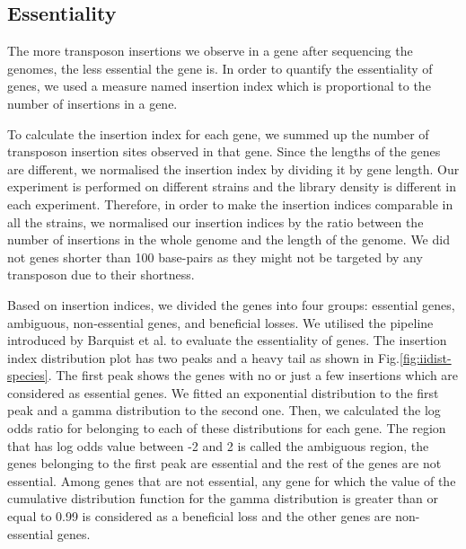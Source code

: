 \documentclass[12pt,letterpaper]{article}
\begin{document}
\subsection{Essentiality}\label{sec:essentiality}
The more transposon insertions we observe in a gene after sequencing the genomes, the less essential the gene is. In order to quantify the essentiality of genes, we used a measure named insertion index which is proportional to the number of insertions in a gene.

To calculate the insertion index for each gene, we summed up the number of transposon insertion sites observed in that gene. Since the lengths of the genes are different, we normalised the insertion index by dividing it by gene length. Our experiment is performed on different strains and the library density is different in each experiment. Therefore, in order to make the insertion indices comparable in all the strains, we normalised our insertion indices by the ratio between the number of insertions in the whole genome and the length of the genome. We did not genes shorter than 100 base-pairs as they might not be targeted by any transposon due to their shortness. 

Based on insertion indices, we divided the genes into four groups: essential genes, ambiguous, non-essential genes, and beneficial losses. We utilised the pipeline introduced by Barquist et al.\@ \cite{barquist_tradis_2016} to evaluate the essentiality of genes. The insertion index distribution plot has two peaks and a heavy tail as shown in Fig.\@ \ref{fig:iidist-species}. The first peak shows the genes with no or just a few insertions which are considered as essential genes. We fitted an exponential distribution to the first peak and a gamma distribution to the second one. Then, we calculated the log odds ratio for belonging to each of these distributions for each gene. The region that has log odds value between -2 and 2 is called the ambiguous region, the genes belonging to the first peak are essential and the rest of the genes are not essential. Among genes that are not essential, any gene for which the value of the cumulative distribution function for the gamma distribution is greater than or equal to 0.99 is considered as a beneficial loss and the other genes are non-essential genes.
\end{document}
